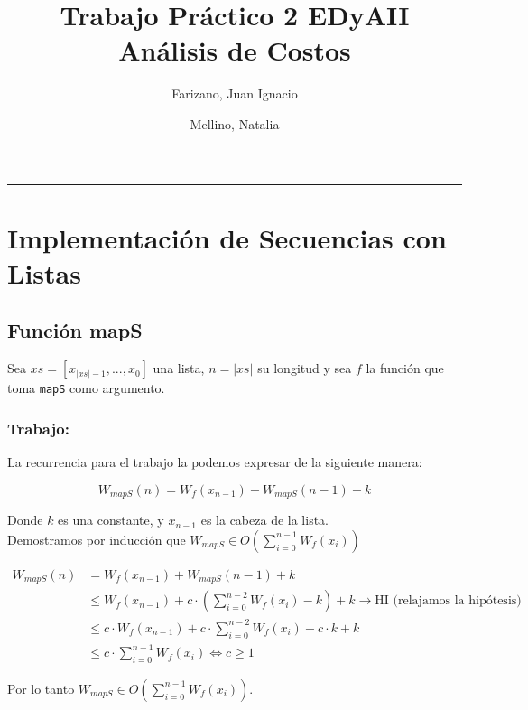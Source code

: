 \documentclass[11pt]{article}
\title{Trabajo Práctico 2 EDyAII \\
        \large Análisis de Costos
}
\author{Farizano, Juan Ignacio \and Mellino, Natalia}
\date{}
\begin{document}
\maketitle

\noindent\rule{\textwidth}{1pt}
\section{Implementación de Secuencias con Listas}


\subsection{Función mapS}
Sea $xs = [x_{\vert xs \vert -1},...,x_0]$ una lista, $n = \vert xs \vert$ su longitud
y sea $f$ la función que toma \texttt{mapS} como argumento. 

\subsubsection{Trabajo:}
La recurrencia para el trabajo la podemos expresar de la siguiente manera:

\begin{equation*}
    W_{mapS}(n) = W_f(x_{n- 1}) + W_{mapS}(n - 1) + k
\end{equation*}

Donde $k$ es una constante, y $x_{n - 1}$ es la cabeza de la lista. \\

Demostramos por inducción que $ W_{mapS} \in O\left(\displaystyle\sum_{i=0}^{n - 1}W_f(x_i)\right) $

\begin{align*}
    W_{mapS}(n) & = W_f(x_{n - 1}) + W_{mapS}(n - 1) + k \\
               & \leq W_f(x_{n - 1}) + c \cdot \left(\displaystyle\sum_{i=0}^{n - 2}W_f(x_i) - k\right) + k \rightarrow \text{HI (relajamos la hipótesis)} \\
               & \leq c \cdot  W_f(x_{n - 1}) + c \cdot \displaystyle\sum_{i=0}^{n - 2}W_f(x_i) - c \cdot k + k \\
               & \leq c \cdot \displaystyle\sum_{i=0}^{n - 1}W_f(x_i) \iff c \geq 1
\end{align*}

Por lo tanto $ W_{mapS} \in O\left(\displaystyle\sum_{i=0}^{n - 1}W_f(x_i)\right) $.
\end{document}
